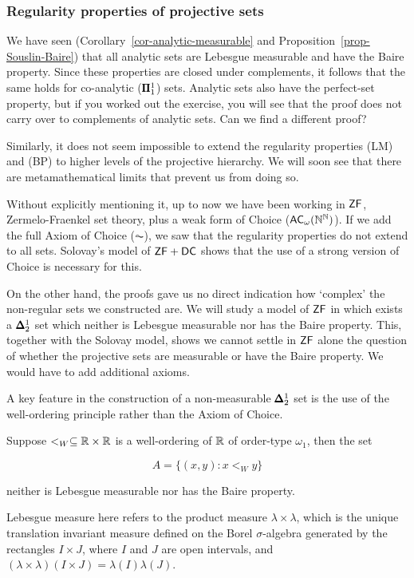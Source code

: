 \subsubsection{Regularity properties of projective sets}

We have seen (Corollary~\ref{cor-analytic-measurable} and Proposition~\ref{prop-Souslin-Baire}) that all analytic sets are Lebesgue measurable and have the Baire property. Since these properties are closed under complements, it follows that the same holds for co-analytic ($\pmb{\Pi}^1_{1}$) sets. Analytic sets also have the perfect-set property, but if you worked out the exercise, you will see that the proof does not carry over to complements of analytic sets. Can we find a different proof?

Similarly, it does not seem impossible to extend the regularity properties (LM) and (BP) to higher levels of the projective hierarchy. We will soon see that there are metamathematical limits that prevent us from doing so.

Without explicitly mentioning it, up to now we have been working in $\mathsf{ZF}$, Zermelo-Fraenkel set theory, plus a weak form of Choice ($\mathsf{AC}_\omega(\mathbb{N}^{\mathbb{N}})$). If we add the full Axiom of Choice ($\AC$), we saw that the regularity properties do not extend to all sets. Solovay's model of $\mathsf{ZF}+\mathsf{DC}$ shows that the use of a strong version of Choice is necessary for this.

On the other hand, the proofs gave us no direct indication how `complex' the non-regular sets we constructed are.
We will study a model of $\mathsf{ZF}$ in which exists a $\pmb{\Delta}^1_2$ set which neither is Lebesgue measurable nor has the Baire property. This, together with the Solovay model, shows we cannot settle in $\mathsf{ZF}$ alone the question of whether the projective sets are measurable or have the Baire property. We would have to add additional axioms.

A key feature in the construction of a non-measurable $\pmb{\Delta}^1_2$ set is the use of the well-ordering principle rather than the Axiom of Choice.

\begin{proposition}\label{prop-non-meas}Suppose $<_W \subseteq \mathbb{R}\times\mathbb{R}$ is a well-ordering of $\mathbb{R}$ of order-type $\omega_1$, then the set

\begin{equation}
A = \{(x,y) \colon x <_W y\}
\end{equation}

neither is Lebesgue measurable nor has the Baire property.

\end{proposition}Lebesgue measure here refers to the product measure $\lambda \times \lambda$, which is the unique translation invariant measure defined on the Borel $\sigma$-algebra generated by the rectangles $I \times J$, where $I$ and $J$ are open intervals, and $(\lambda\times \lambda)(I \times J) = \lambda(I)\lambda(J)$.

